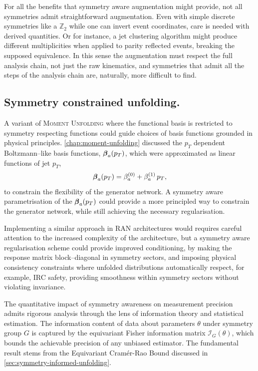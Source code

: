         For all the benefits that symmetry aware augmentation might provide, not all symmetries admit straightforward augmentation.
        Even with simple discrete symmetries like a \(\mathbb{Z}_2\) while one can invert event coordinates, care is needed with derived quantities.
        Or for instance, a jet clustering algorithm might produce different multiplicities when applied to parity reflected events, breaking the supposed equivalence.
        In this sense the augmentation must respect the full analysis chain, not just the raw kinematics, and symmetries that admit all the steps of the analysis chain are, naturally, more difficult to find.

    \subsection{Symmetry constrained unfolding.}
        A variant of \textsc{Moment Unfolding} where the functional basis is restricted to symmetry respecting functions could guide choices of basis functions grounded in physical principles.
        \cref{chap:moment-unfolding} discussed the \(p_T\) dependent Boltzmann--like basis functions, \(\vb*{\beta}_a(p_T)\), which were approximated as linear functions of jet \(p_T\),
        \[
            \vb*{\beta}_a(p_T) = {\beta}_a^{(0)} + {\beta}_a^{(1)}\,p_T,
        \]
        to constrain the flexibility of the generator network.
        A symmetry aware parametrisation of the \(\vb*{\beta}_a(p_T)\) could provide a more principled way to constrain the generator network, while still achieving the necessary regularisation.
        
        Implementing a similar approach in RAN architectures would requires careful attention to the increased complexity of the architecture, but a symmetry aware regularisation scheme could provide improved conditioning, by making the response matrix block--diagonal in symmetry sectors, and imposing physical consistency constraints where unfolded distributions automatically respect, for example, IRC safety, providing smoothness within symmetry sectors without violating invariance.

        The quantitative impact of symmetry awareness on measurement precision admits rigorous analysis through the lens of information theory and statistical estimation.
        The information content of data about parameters \(\theta\) under symmetry group \(G\) is captured by the equivariant Fisher information matrix \(\mathcal{I}_G(\theta)\), which bounds the achievable precision of any unbiased estimator.
        The fundamental result stems from the Equivariant Cramér-Rao Bound discussed in \cref{sec:symmetry-informed-unfolding}.
        
